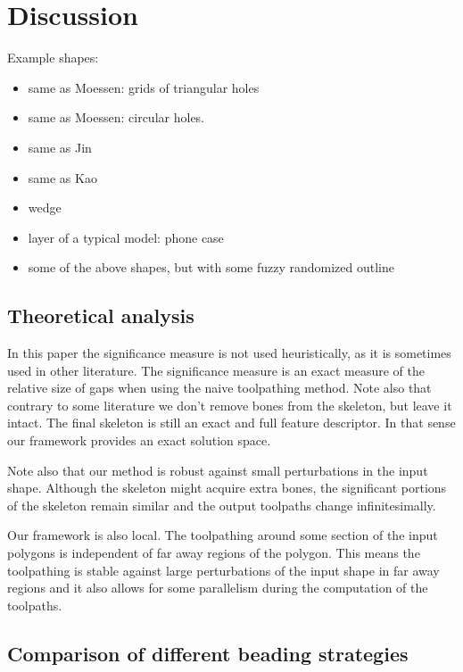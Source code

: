 \section{Discussion}

Example shapes:
\begin{itemize}
\item same as Moessen: grids of triangular holes
\item same as Moessen: circular holes.
\item same as Jin 
\item same as Kao
\item wedge
\item layer of a typical model: phone case
\item some of the above shapes, but with some fuzzy randomized outline
\end{itemize}


\subsection{Theoretical analysis}
In this paper the significance measure is not used heuristically, as it is sometimes used in other literature.
The significance measure is an exact measure of the relative size of gaps when using the naive toolpathing method.
Note also that contrary to some literature we don't remove bones from the skeleton, but leave it intact.
The final skeleton is still an exact and full feature descriptor.
In that sense our framework provides an exact solution space.

Note also that our method is robust against small perturbations in the input shape.
Although the skeleton might acquire extra bones, the significant portions of the skeleton remain similar and the output toolpaths change infinitesimally.

Our framework is also local.
The toolpathing around some section of the input polygons is independent of far away regions of the polygon.
This means the toolpathing is stable against large perturbations of the input shape in far away regions
and it also allows for some parallelism during the computation of the toolpaths.


\subsection{Comparison of different beading strategies}
